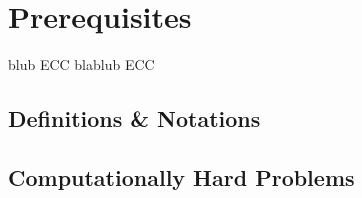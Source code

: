 \chapter{Prerequisites}\label{ch:background}
blub \ac{ECC} blablub \ac{ECC}

\section{Definitions \& Notations}

\section{Computationally Hard Problems}


%
%
%
